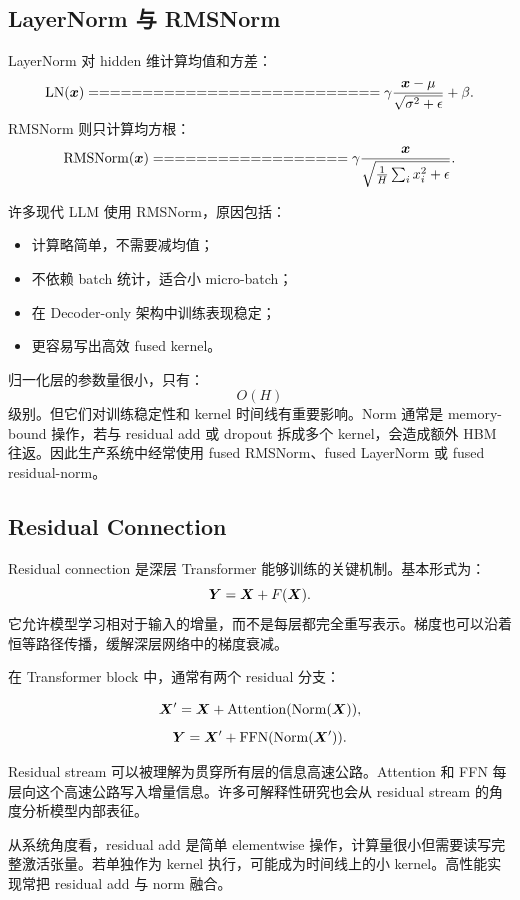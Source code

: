 \subsection{LayerNorm 与 RMSNorm}
\label{subsec:transformer-layernorm-rmsnorm}

LayerNorm 对 hidden 维计算均值和方差：
\[
\operatorname{LN}(\vect{x})
===========================

\gamma
\frac{\vect{x}-\mu}{\sqrt{\sigma^2+\epsilon}}
+
\beta.
\]
RMSNorm 则只计算均方根：
\[
\RMSNorm(\vect{x})
==================

\gamma
\frac{\vect{x}}{\sqrt{\frac{1}{H}\sum_i x_i^2+\epsilon}}.
\]

许多现代 LLM 使用 RMSNorm，原因包括：

\begin{itemize}
\item 计算略简单，不需要减均值；
\item 不依赖 batch 统计，适合小 micro-batch；
\item 在 Decoder-only 架构中训练表现稳定；
\item 更容易写出高效 fused kernel。
\end{itemize}

归一化层的参数量很小，只有：
\[
O(H)
\]
级别。但它们对训练稳定性和 kernel 时间线有重要影响。Norm 通常是 memory-bound 操作，若与 residual add 或 dropout 拆成多个 kernel，会造成额外 HBM 往返。因此生产系统中经常使用 fused RMSNorm、fused LayerNorm 或 fused residual-norm。

\subsection{Residual Connection}
\label{subsec:residual-connection}

Residual connection 是深层 Transformer 能够训练的关键机制。基本形式为：
\[
\bm{Y}=\bm{X}+F(\bm{X}).
\]
它允许模型学习相对于输入的增量，而不是每层都完全重写表示。梯度也可以沿着恒等路径传播，缓解深层网络中的梯度衰减。

在 Transformer block 中，通常有两个 residual 分支：

\[
\bm{X}'=\bm{X}+\operatorname{Attention}(\operatorname{Norm}(\bm{X})),
\]
\[
\bm{Y}=\bm{X}'+\operatorname{FFN}(\operatorname{Norm}(\bm{X}')).
\]

Residual stream 可以被理解为贯穿所有层的信息高速公路。Attention 和 FFN 每层向这个高速公路写入增量信息。许多可解释性研究也会从 residual stream 的角度分析模型内部表征。

从系统角度看，residual add 是简单 elementwise 操作，计算量很小但需要读写完整激活张量。若单独作为 kernel 执行，可能成为时间线上的小 kernel。高性能实现常把 residual add 与 norm 融合。

